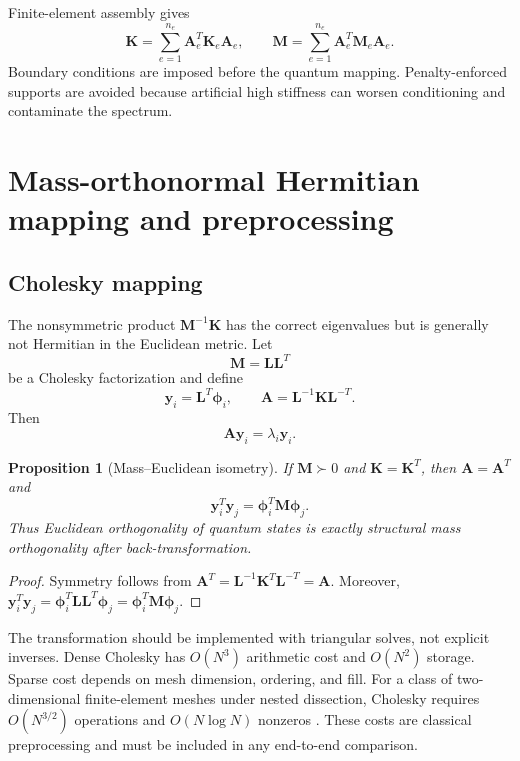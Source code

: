 \documentclass{ieeeaccess}
\newcommand{\M}{\mathbf{M}}
\newcommand{\K}{\mathbf{K}}
\newcommand{\A}{\mathbf{A}}
\newcommand{\ph}{\boldsymbol{\phi}}
\newcommand{\yy}{\mathbf{y}}
\newtheorem{proposition}{Proposition}
\begin{document}
Finite-element assembly gives
\begin{equation}
\K=\sum_{e=1}^{n_e}\mathbf A_e^T\K_e\mathbf A_e,
\qquad
\M=\sum_{e=1}^{n_e}\mathbf A_e^T\M_e\mathbf A_e.
\label{eq:assembly}
\end{equation}
Boundary conditions are imposed before the quantum mapping. Penalty-enforced supports are avoided because artificial high stiffness can worsen conditioning and contaminate the spectrum.

\section{Mass-orthonormal Hermitian mapping and preprocessing}
\label{sec:mapping}

\subsection{Cholesky mapping}

The nonsymmetric product $\M^{-1}\K$ has the correct eigenvalues but is generally not Hermitian in the Euclidean metric. Let
\begin{equation}
\M=\mathbf L\mathbf L^T
\label{eq:chol}
\end{equation}
be a Cholesky factorization and define
\begin{equation}
\yy_i=\mathbf L^T\ph_i,
\qquad
\A=\mathbf L^{-1}\K\mathbf L^{-T}.
\label{eq:map}
\end{equation}
Then
\begin{equation}
\A\yy_i=\lambda_i\yy_i.
\label{eq:standard_eig}
\end{equation}

\begin{proposition}[Mass--Euclidean isometry]
If $\M\succ0$ and $\K=\K^T$, then $\A=\A^T$ and
\begin{equation}
\yy_i^T\yy_j=\ph_i^T\M\ph_j.
\label{eq:isometry}
\end{equation}
Thus Euclidean orthogonality of quantum states is exactly structural mass orthogonality after back-transformation.
\end{proposition}

\begin{proof}
Symmetry follows from $\A^T=\mathbf L^{-1}\K^T\mathbf L^{-T}=\A$. Moreover,
$\yy_i^T\yy_j=\ph_i^T\mathbf L\mathbf L^T\ph_j=\ph_i^T\M\ph_j$.
\end{proof}

The transformation should be implemented with triangular solves, not explicit inverses. Dense Cholesky has $O(N^3)$ arithmetic cost and $O(N^2)$ storage. Sparse cost depends on mesh dimension, ordering, and fill. For a class of two-dimensional finite-element meshes under nested dissection, Cholesky requires $O(N^{3/2})$ operations and $O(N\log N)$ nonzeros \cite{GeorgeNg1988}. These costs are classical preprocessing and must be included in any end-to-end comparison.
\end{document}
